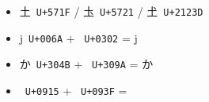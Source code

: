 \documentclass[a4paper]{article}
\newcommand*\showUC[1]{\ \texttt{\footnotesize U+#1}}
\begin{document}
\begin{itemize}
\item {\fipm 土}\showUC{571F} /
      {\fipm 圡}\showUC{5721} /
      {\fipm 𡈽}\showUC{2123D}
\item {\fchr j}\showUC{006A} + {\fchr{}}\showUC{0302}
      = {\fchr j}
\item {\fipm か}\showUC{304B} + {\fipm{}}\showUC{309A}
      = {\fipm か}
\item {\faru {}}\showUC{0915} + {\faru{}}\showUC{093F}
      = {\faru {}}
\end{itemize}
\end{document}
